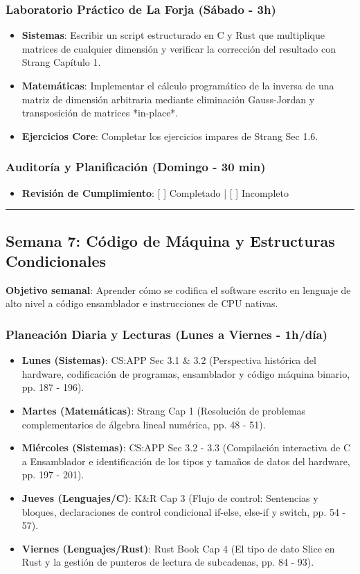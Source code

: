 \documentclass[11pt, a4paper]{article}
\begin{document}
\subsubsection{Laboratorio Práctico de La Forja (Sábado - 3h)}
\begin{itemize}
    \item \textbf{Sistemas}: Escribir un script estructurado en C y Rust que multiplique matrices de cualquier dimensión y verificar la corrección del resultado con Strang Capítulo 1.
    \item \textbf{Matemáticas}: Implementar el cálculo programático de la inversa de una matriz de dimensión arbitraria mediante eliminación Gauss-Jordan y transposición de matrices *in-place*.
    \item \textbf{Ejercicios Core}: Completar los ejercicios impares de Strang Sec 1.6.
\end{itemize}

\subsubsection{Auditoría y Planificación (Domingo - 30 min)}
\begin{itemize}
    \item \textbf{Revisión de Cumplimiento}: [ ] Completado | [ ] Incompleto
\end{itemize}

\noindent\rule{\textwidth}{0.4pt}

\subsection{Semana 7: Código de Máquina y Estructuras Condicionales}
\textbf{Objetivo semanal}: Aprender cómo se codifica el software escrito en lenguaje de alto nivel a código ensamblador e instrucciones de CPU nativas.

\subsubsection{Planeación Diaria y Lecturas (Lunes a Viernes - 1h/día)}
\begin{itemize}
    \item \textbf{Lunes (Sistemas)}: CS:APP Sec 3.1 \& 3.2 (Perspectiva histórica del hardware, codificación de programas, ensamblador y código máquina binario, pp. 187 - 196).
    \item \textbf{Martes (Matemáticas)}: Strang Cap 1 (Resolución de problemas complementarios de álgebra lineal numérica, pp. 48 - 51).
    \item \textbf{Miércoles (Sistemas)}: CS:APP Sec 3.2 - 3.3 (Compilación interactiva de C a Ensamblador e identificación de los tipos y tamaños de datos del hardware, pp. 197 - 201).
    \item \textbf{Jueves (Lenguajes/C)}: K\&R Cap 3 (Flujo de control: Sentencias y bloques, declaraciones de control condicional if-else, else-if y switch, pp. 54 - 57).
    \item \textbf{Viernes (Lenguajes/Rust)}: Rust Book Cap 4 (El tipo de dato Slice en Rust y la gestión de punteros de lectura de subcadenas, pp. 84 - 93).
\end{itemize}
\end{document}
